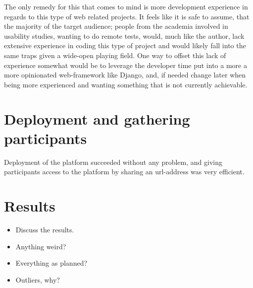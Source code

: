   The only remedy for this that comes to mind is more development experience in
  regards to this type of web related projects. It feels like it is safe to assume, that the
  majority of the target audience; people from the academia involved in
  usability studies, wanting to do remote tests, would, much like the author,
  lack extensive experience in coding this type of project and would likely
  fall into the same traps given a wide-open playing field. One way to offset
  this lack of experience somewhat would be to leverage the developer time put
  into a more a more opinionated web-framework like
  Django\cite{citeDjangoHomepage}, and, if needed change later when being more
  experienced and wanting something that is not currently achievable.



\section{Deployment and gathering participants}

  Deployment of the platform succeeded without any problem, and giving
  participants access to the platform by sharing an url-address was very
  efficient.


\section{Results}

  \begin{itemize}
    \item{Discuss the results.}
    \item{Anything weird?}
    \item{Everything as planned?}
    \item{Outliers, why?}
  \end{itemize}

